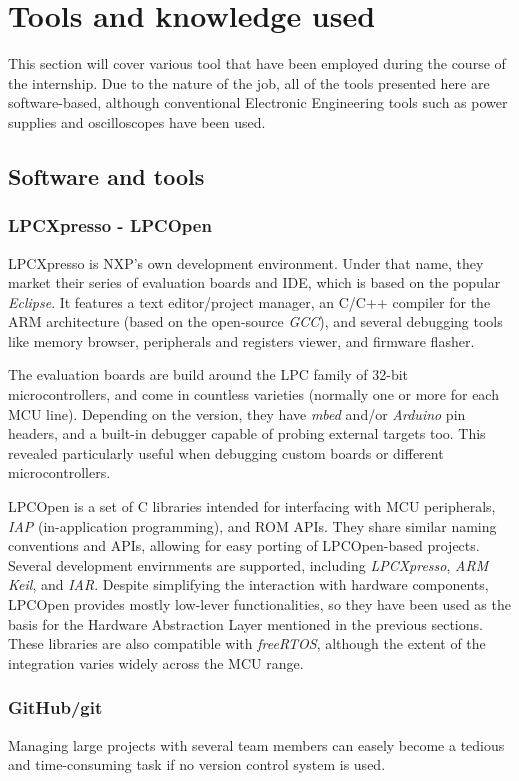 \section{Tools and knowledge used}
This section will cover various tool that have been employed during the course of the internship.
Due to the nature of the job, all of the tools presented here are software-based, although conventional Electronic Engineering tools such as power supplies and oscilloscopes have been used.

\subsection{Software and tools}

\subsubsection{LPCXpresso - LPCOpen}
LPCXpresso is NXP's own development environment.
Under that name, they market their series of evaluation boards and IDE, which is based on the popular \emph{Eclipse}. 
It features a text editor/project manager, an C/C++ compiler for the ARM architecture (based on the open-source \emph{GCC}), and several debugging tools like memory browser, peripherals and registers viewer, and firmware flasher.

The evaluation boards are build around the LPC family of 32-bit microcontrollers, and come in countless varieties (normally one or more for each MCU line).
Depending on the version, they have \emph{mbed} and/or \emph{Arduino} pin headers, and a built-in debugger capable of probing external targets too.
This revealed particularly useful when debugging custom boards or different microcontrollers.

LPCOpen is a set of C libraries intended for interfacing with MCU peripherals, \emph{IAP} (in-application programming), and ROM APIs.
They share similar naming conventions and APIs, allowing for easy porting of LPCOpen-based projects.
Several development envirnments are supported, including \emph{LPCXpresso}, \emph{ARM Keil}, and \emph{IAR}.
Despite simplifying the interaction with hardware components, LPCOpen provides mostly low-lever functionalities, so they have been used as the basis for the Hardware Abstraction Layer mentioned in the previous sections.
These libraries are also compatible with \emph{freeRTOS}, although the extent of the integration varies widely across the MCU range.


\subsubsection{GitHub/git}
Managing large projects with several team members can easely become a tedious and time-consuming task if no version control system is used. 

